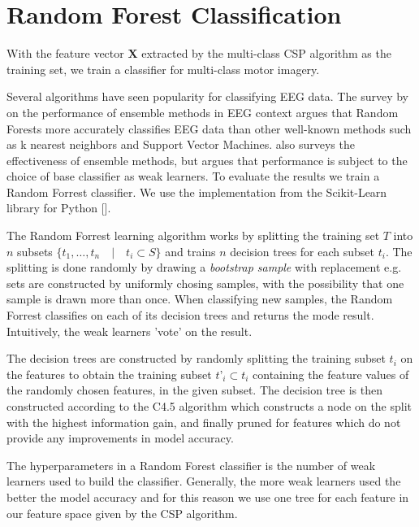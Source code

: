 \section{Random Forest Classification}

With the feature vector $\mathbf{X}$ extracted by the multi-class CSP algorithm as the training set, we train a classifier for multi-class motor imagery.

Several algorithms have seen popularity for classifying EEG data. The survey by \citet{chan2015systematic} on the performance of ensemble methods in EEG context argues that Random Forests more accurately classifies EEG data than other well-known methods such as k nearest neighbors and Support Vector Machines. \citet{sun2007experimental} also surveys the effectiveness of ensemble methods, but argues that performance is subject to the choice of base classifier as weak learners. To evaluate the results we train a Random Forrest classifier. We use the implementation from the Scikit-Learn library for Python [\citet{scikit-learn}].   

The Random Forrest learning algorithm works by splitting the training set $T$ into $n$ subsets $\{t_1,…,t_n \quad | \quad t_i \subset S\}$ and trains $n$ decision trees for each subset $t_i$. The splitting is done randomly by drawing a \emph{bootstrap sample} with replacement e.g. sets are constructed by uniformly chosing samples, with the possibility that one sample is drawn more than once. When classifying new samples, the Random Forrest classifies on each of its decision trees and returns the mode result. Intuitively, the weak learners 'vote' on the result.

The decision trees are constructed by randomly splitting the training subset $t_i$ on the features to obtain the training subset $t’_i \subset t_i$ containing the feature values of the randomly chosen features, in the given subset. The decision tree is then constructed according to the C4.5 algorithm which constructs a node on the split with the highest information gain, and finally pruned for features which do not provide any improvements in model accuracy.

The hyperparameters in a Random Forest classifier is the number of weak learners used to build the classifier. Generally, the more weak learners used the better the model accuracy and for this reason we use one tree for each feature in our feature space given by the CSP algorithm. 